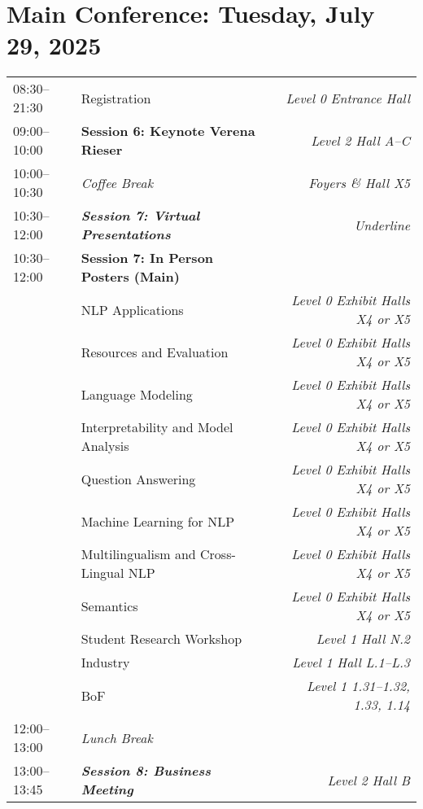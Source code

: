\clearpage


\section{Main Conference: Tuesday, July 29, 2025}

\begin{xltabular}{\linewidth}{l X r}
    08:30--21:30    &   Registration    &   \textit{Level 0 Entrance Hall} \\
    
    09:00--10:00    &   \textbf{Session 6: Keynote Verena Rieser}    &   \textit{Level 2 Hall A--C} \\
    
    10:00--10:30    &   \textit{Coffee Break}    & \textit{Foyers \& Hall X5}  \\
    
    10:30--12:00    &   \textit{\textbf{Session 7: Virtual Presentations}}    & \textit{Underline}  \\
    10:30--12:00    &   \textbf{Session 7: In Person Posters (Main)} & \\
    &   NLP Applications  & \textit{Level 0 Exhibit Halls X4 or X5} \\
    &   Resources and Evaluation  & \textit{Level 0 Exhibit Halls X4 or X5} \\
    &   Language Modeling  & \textit{Level 0 Exhibit Halls X4 or X5} \\
    &   Interpretability and Model Analysis   & \textit{Level 0 Exhibit Halls X4 or X5} \\
    &   Question Answering  & \textit{Level 0 Exhibit Halls X4 or X5} \\
    &   Machine Learning for NLP  & \textit{Level 0 Exhibit Halls X4 or X5} \\
    &   Multilingualism and Cross-Lingual NLP  & \textit{Level 0 Exhibit Halls X4 or X5} \\
    &   Semantics  & \textit{Level 0 Exhibit Halls X4 or X5} \\
    &   Student Research Workshop  & \textit{Level 1 Hall N.2} \\
    &   Industry  & \textit{Level 1 Hall L.1--L.3} \\
    &   BoF & \textit{Level 1 1.31--1.32, 1.33, 1.14}  \\

    12:00--13:00    &   \textit{Lunch Break}  & \\

    13:00--13:45    &   \textit{\textbf{Session 8: Business Meeting}}  & \textit{Level 2 Hall B}\\


\end{xltabular}
